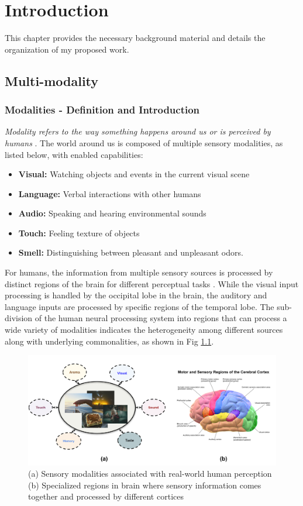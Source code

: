 \chapter{Introduction}
\label{cha:introduction}
This chapter provides the necessary background material and details the organization of my proposed work.

\section{Multi-modality}
\subsection{Modalities - Definition and Introduction}
\textit{Modality refers to the way something happens around us or is perceived by humans} \cite{Baltruaitis2017MultimodalML}. The world around us is composed of multiple sensory modalities, as listed below, with enabled capabilities:
\begin{itemize}
    \item \textbf{Visual:} Watching objects and events in the current visual scene
    \item \textbf{Language:} Verbal interactions with other humans 
    \item \textbf{Audio:} Speaking and hearing environmental sounds 
    \item \textbf{Touch:} Feeling texture of objects 
    \item \textbf{Smell:} Distinguishing between pleasant and unpleasant odors.
\end{itemize}
For humans, the information from multiple sensory sources is processed by distinct regions of the brain for different perceptual tasks \cite{Alain2001WhatA,BornkesselSchlesewsky2015NeurobiologicalRO,Wallace2002HistochemicalIO}. While the visual input processing is handled by the occipital lobe in the brain, the auditory and language inputs are processed by specific regions of the temporal lobe. The sub-division of the human neural processing system into regions that can process a wide variety of modalities indicates the heterogeneity among different sources along with underlying commonalities, as shown in Fig \ref{cerebral_cortex_modalities}.

\begin{figure}
    \includegraphics[width=\textwidth]{figures/cererbral_cortex_multiple_modalities.png}
    \caption{ (a)  Sensory modalities associated with real-world human perception  (b)  Specialized regions in brain where sensory information comes together and processed by different cortices}
    \label{cerebral_cortex_modalities}
\end{figure}


